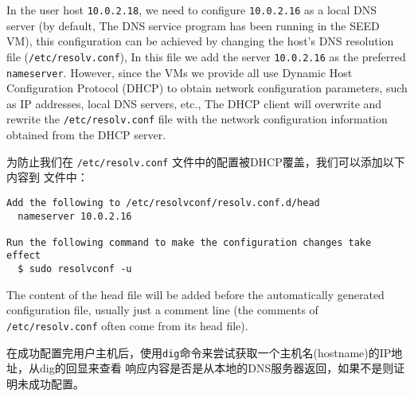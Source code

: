 In the user host {\tt 10.0.2.18}, we need to configure {\tt 10.0.2.16} as a local DNS server (by default,
The DNS service program has been running in the SEED VM), this configuration can be achieved by changing the host's DNS resolution file (\texttt{/etc/resolv.conf}),
In this file we add the server \texttt{10.0.2.16} as the preferred \texttt{nameserver}.
However, since the VMs we provide all use Dynamic Host Configuration Protocol (DHCP) to obtain network configuration parameters, such as IP addresses, local DNS servers, etc.,
The DHCP client will overwrite and rewrite the \texttt{/etc/resolv.conf} file with the network configuration information obtained from the DHCP server.


为防止我们在 \texttt{/etc/resolv.conf} 文件中的配置被DHCP覆盖，我们可以添加以下内容到
文件中：

\begin{lstlisting}
Add the following to /etc/resolvconf/resolv.conf.d/head
  nameserver 10.0.2.16

Run the following command to make the configuration changes take effect
  $ sudo resolvconf -u
\end{lstlisting}
 
The content of the head file will be added before the automatically generated configuration file, usually just a comment line (the comments of \texttt{/etc/resolv.conf} often come from its head file).


在成功配置完用户主机后，使用\texttt{dig}命令来尝试获取一个主机名(hostname)的IP地址，从dig的回显来查看
响应内容是否是从本地的DNS服务器返回，如果不是则证明未成功配置。


